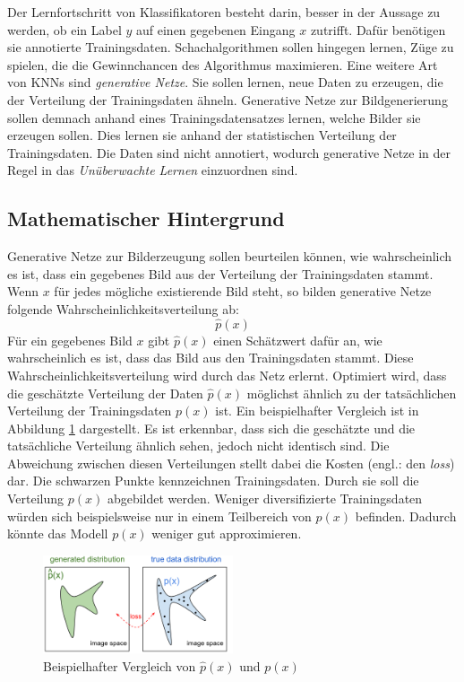 \label{chap:NoGANs}

Der Lernfortschritt von Klassifikatoren besteht darin, besser in der Aussage zu werden, ob ein Label $y$ auf einen gegebenen Eingang $x$ zutrifft. Dafür benötigen sie annotierte Trainingsdaten. Schachalgorithmen sollen hingegen lernen, Züge zu spielen, die die Gewinnchancen des Algorithmus maximieren. Eine weitere Art von \acp{KNN} sind \emph{generative Netze}. Sie sollen lernen, neue Daten zu erzeugen, die der Verteilung der Trainingsdaten ähneln. Generative Netze zur Bildgenerierung sollen demnach anhand eines Trainingsdatensatzes lernen, welche Bilder sie erzeugen sollen. Dies lernen sie anhand der statistischen Verteilung der Trainingsdaten. Die Daten sind nicht annotiert, wodurch generative Netze in der Regel in das \emph{Unüberwachte Lernen} einzuordnen sind.

\subsection{Mathematischer Hintergrund}
Generative Netze zur Bilderzeugung sollen beurteilen können, wie wahrscheinlich es ist, dass ein gegebenes Bild aus der Verteilung der Trainingsdaten stammt. Wenn $x$ für jedes mögliche existierende Bild steht, so bilden generative Netze folgende Wahrscheinlichkeitsverteilung ab:
\begin{equation}
   \hat{p}(x)
\end{equation}
Für ein gegebenes Bild $x$ gibt $\hat{p}(x)$ einen Schätzwert dafür an, wie wahrscheinlich es ist, dass das Bild aus den Trainingsdaten stammt. Diese Wahrscheinlichkeitsverteilung wird durch das Netz erlernt. Optimiert wird, dass die geschätzte Verteilung der Daten $\hat{p}(x)$ möglichst ähnlich zu der tatsächlichen Verteilung der Trainingsdaten $p(x)$ ist. Ein beispielhafter Vergleich ist in Abbildung \ref{fig:generativeNetsPx} dargestellt. Es ist erkennbar, dass sich die geschätzte und die tatsächliche Verteilung ähnlich sehen, jedoch nicht identisch sind. Die Abweichung zwischen diesen Verteilungen stellt dabei die Kosten (engl.: den \emph{loss}) dar. Die schwarzen Punkte kennzeichnen Trainingsdaten. Durch sie soll die Verteilung $p(x)$ abgebildet werden. Weniger diversifizierte Trainingsdaten würden sich beispielsweise nur in einem Teilbereich von $p(x)$ befinden. Dadurch könnte das Modell $p(x)$ weniger gut approximieren.

\begin{figure}[H]
   \centering
   \includegraphics[width=0.5\textwidth]{images/Generative Networks/p(x) Distribution.png}
   \caption{Beispielhafter Vergleich von $\hat{p}(x)$ und $p(x)$ \cite{openAiGenerativeNets}}
   \label{fig:generativeNetsPx}
\end{figure}

